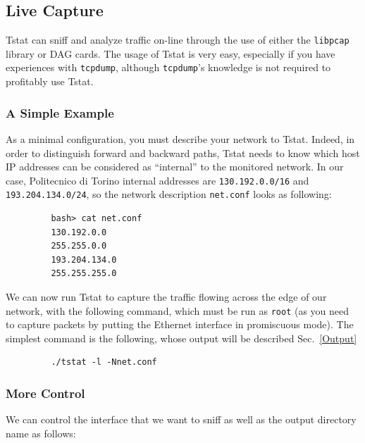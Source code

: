\documentclass[11pt]{article}
\begin{document}
\subsection{Live Capture\label{Live_Capture}}


Tstat can sniff and analyze traffic on-line through the
use of either the \texttt{libpcap} library or DAG cards.
The usage of Tstat is very easy, especially if you have
experiences with \texttt{tcpdump}, although \texttt{tcpdump}'s knowledge
is not required to profitably use Tstat.

\subsubsection{A Simple Example\label{A_Simple_Example}}


As a minimal configuration, you must describe your network to Tstat. Indeed, in
order to distinguish forward and backward paths, Tstat needs  to know which host
IP addresses can be considered as ``internal'' to the monitored network. In our
case, Politecnico di Torino internal addresses are \texttt{130.192.0.0/16} and
\texttt{193.204.134.0/24}, so the network description \texttt{net.conf} looks as  following:

\begin{small}\begin{verbatim}
         bash> cat net.conf
         130.192.0.0
         255.255.0.0
         193.204.134.0
         255.255.255.0
\end{verbatim}\end{small} \noindent
We can now run Tstat to capture the traffic flowing across the edge
of our network, with the following command, which must be run as \texttt{root} (as you
need to capture packets by putting the Ethernet interface in promiscuous mode).
The simplest command is the following, whose output will
be described Sec.~\ref{Output}

\begin{small}\begin{verbatim}
         ./tstat -l -Nnet.conf
\end{verbatim}\end{small} \noindent
\subsubsection{More Control\label{More_Control}}


We can control the interface that we want to sniff as well as
the output directory name as follows:
\end{document}
